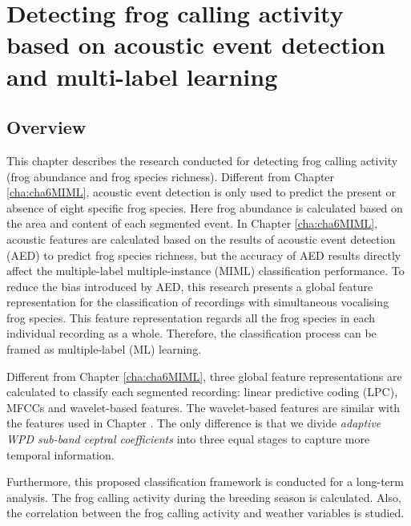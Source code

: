 
\chapter{Detecting frog calling activity based on acoustic event detection and multi-label learning}
\label{cha:cha7ML}


\section{Overview}
\label{sect:introduction}

This chapter describes the research conducted for detecting frog calling activity (frog abundance and frog species richness). Different from Chapter \ref{cha:cha6MIML}, acoustic event detection is only used to predict the present or absence of eight specific frog species. Here frog abundance is calculated based on the area and content of each segmented event.
In Chapter \ref{cha:cha6MIML}, acoustic features are calculated based on the results of acoustic event detection (AED) to predict frog species richness, but the accuracy of AED results directly affect the multiple-label multiple-instance (MIML) classification performance.
To reduce the bias introduced by AED, this research presents a global feature representation for the classification of recordings with simultaneous vocalising frog species. This feature representation regards all the frog species in each individual recording as a whole. Therefore, the classification process can be framed as multiple-label (ML) learning.  



Different from Chapter \ref{cha:cha6MIML}, three global feature representations are calculated to classify each segmented recording: linear predictive coding (LPC), MFCCs and wavelet-based features. The wavelet-based features are similar with the features used in Chapter \label{cha:cha5Wavelet}. The only difference is that we divide \textit{adaptive WPD sub-band ceptral coefficients} into three equal stages to capture more temporal information.


 
Furthermore, this proposed classification framework is conducted for a long-term analysis. The frog calling activity during the breeding season is calculated. Also, the correlation between the frog calling activity and weather variables is studied. 

  



